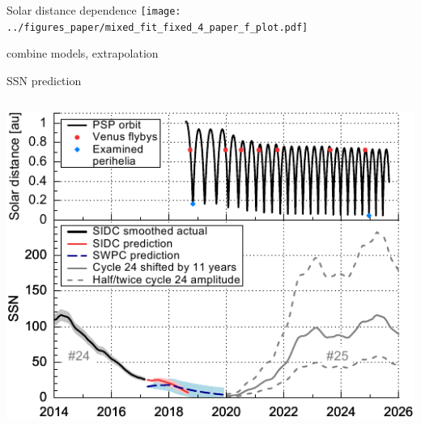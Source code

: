 \begin{frame}[c]{Solar distance dependence}{}
	\centering
	\texttt{[image: ../figures\_paper/mixed\_fit\_fixed\_4\_paper\_f\_plot.pdf]}
\end{frame}

\begin{frame}[c]{}{}
	combine models, extrapolation
\end{frame}
\begin{frame}[c]{SSN prediction}{}
	\begin{columns}[c]
		
		\includegraphics[width=\textwidth]{../figures_paper/SPP_orbit_predicted_SSN_overview_f_plot.pdf}


	\end{columns}
\end{frame}

